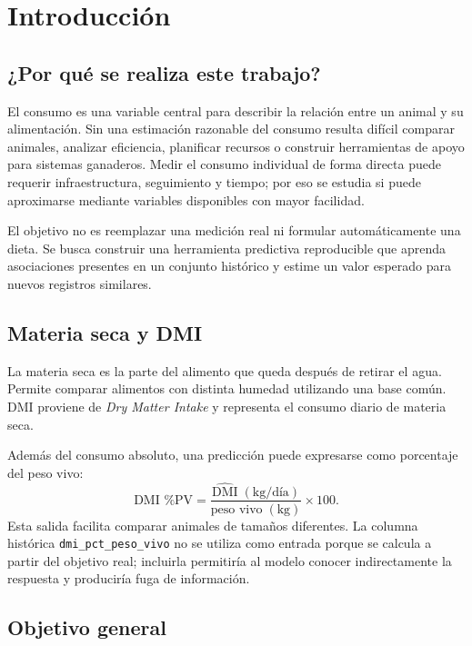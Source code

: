 \documentclass[11pt,a4paper]{article}
\newcommand{\codigo}[1]{\nolinkurl{#1}}
\begin{document}
\section{Introducción}

\subsection{¿Por qué se realiza este trabajo?}

El consumo es una variable central para describir la relación entre un animal y su alimentación. Sin una estimación razonable del consumo resulta difícil comparar animales, analizar eficiencia, planificar recursos o construir herramientas de apoyo para sistemas ganaderos. Medir el consumo individual de forma directa puede requerir infraestructura, seguimiento y tiempo; por eso se estudia si puede aproximarse mediante variables disponibles con mayor facilidad.

El objetivo no es reemplazar una medición real ni formular automáticamente una dieta. Se busca construir una herramienta predictiva reproducible que aprenda asociaciones presentes en un conjunto histórico y estime un valor esperado para nuevos registros similares.

\subsection{Materia seca y DMI}

La materia seca es la parte del alimento que queda después de retirar el agua. Permite comparar alimentos con distinta humedad utilizando una base común. DMI proviene de \textit{Dry Matter Intake} y representa el consumo diario de materia seca.

Además del consumo absoluto, una predicción puede expresarse como porcentaje del peso vivo:
\begin{equation}
\text{DMI \% PV}=\frac{\widehat{\text{DMI}}\;(\text{kg/día})}{\text{peso vivo}\;(\text{kg})}\times100.
\end{equation}
Esta salida facilita comparar animales de tamaños diferentes. La columna histórica \codigo{dmi_pct_peso_vivo} no se utiliza como entrada porque se calcula a partir del objetivo real; incluirla permitiría al modelo conocer indirectamente la respuesta y produciría fuga de información.

\subsection{Objetivo general}
\end{document}
